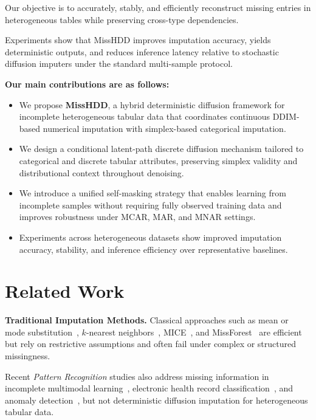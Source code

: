 \documentclass[times, review, 10pt]{elsarticle}
\newcommand{\DIFaddbegin}{\begingroup\color{blue}}
\newcommand{\DIFaddend}{\endgroup}
\begin{document}
\DIFaddbegin
Our objective is to accurately, stably, and efficiently reconstruct missing entries in heterogeneous tables while preserving cross-type dependencies.

Experiments show that MissHDD improves imputation accuracy, yields deterministic outputs, and reduces inference latency relative to stochastic diffusion imputers under the standard multi-sample protocol.
\DIFaddend

\textbf{Our main contributions are as follows:}
\begin{itemize}
\DIFaddbegin
\item We propose \textbf{MissHDD}, a hybrid deterministic diffusion framework for incomplete heterogeneous tabular data that coordinates continuous DDIM-based numerical imputation with simplex-based categorical imputation.
\item We design a conditional latent-path discrete diffusion mechanism tailored to categorical and discrete tabular attributes, preserving simplex validity and distributional context throughout denoising.
\DIFaddend
\item We introduce a unified self-masking strategy that enables learning from incomplete samples without requiring fully observed training data and improves robustness under MCAR, MAR, and MNAR settings.
\DIFaddbegin
\item Experiments across heterogeneous datasets show improved imputation accuracy, stability, and inference efficiency over representative baselines.
\DIFaddend
\end{itemize}

\section{Related Work}

\textbf{Traditional Imputation Methods.}
\DIFaddbegin
Classical approaches such as mean or mode substitution~\cite{mean,mean2},
$k$-nearest neighbors~\cite{knn}, MICE~\cite{mice}, and
MissForest~\cite{missforest} are efficient but rely on restrictive assumptions
and often fail under complex or structured missingness.

Recent \textit{Pattern Recognition} studies also address missing information in
incomplete multimodal learning~\cite{mce2026}, electronic health record
classification~\cite{moss2026}, and anomaly detection~\cite{vmgm2026}, but not
deterministic diffusion imputation for heterogeneous tabular data.
\DIFaddend
\end{document}
